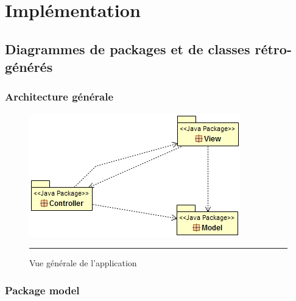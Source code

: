 
\chapter{Implémentation} %

\label{Chapter3} %



\section{Diagrammes de packages et de classes rétro-générés}

\subsection{Architecture générale}
\begin{figure}[H]
	\centering
		\includegraphics{Figures/retro_archi}
		\rule{35em}{0.5pt}
	\caption[Vue générale de l'application]{Vue générale de l'application}
\end{figure}

\subsection{Package model}
